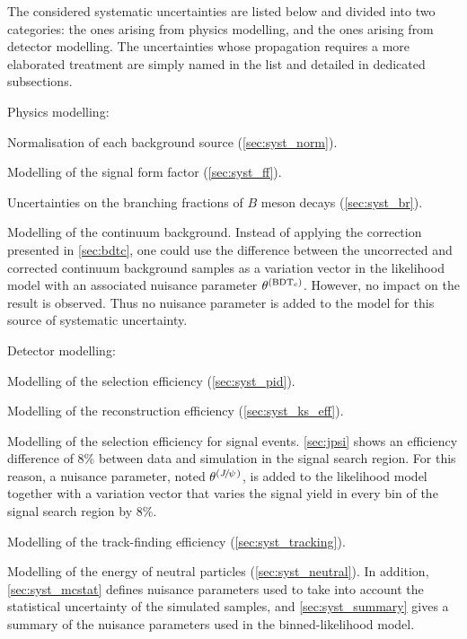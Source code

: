 The considered systematic uncertainties are listed below and divided into two categories: the ones arising from physics modelling, and the ones arising from detector modelling.
The uncertainties whose propagation requires a more elaborated treatment are simply named in the list and detailed in dedicated subsections.
\bi
\item Physics modelling:
\bi
\item Normalisation of each background source (\cref{sec:syst_norm}).
\item Modelling of the signal form factor (\cref{sec:syst_ff}).
\item Uncertainties on the branching fractions of $B$ meson decays (\cref{sec:syst_br}).
\item Modelling of the continuum background.
Instead of applying the correction presented in \cref{sec:bdtc}, one could use the difference between the uncorrected and corrected continuum background samples as a variation vector in the likelihood model with an associated nuisance parameter $\theta^{(\mathrm{\mathrm{BDT_c}})}$.
However, no impact on the result is observed.
Thus no nuisance parameter is added to the model for this source of systematic uncertainty.
\ei
\item Detector modelling:
\bi
\item Modelling of the \PID selection efficiency (\cref{sec:syst_pid}).
\item Modelling of the \KS reconstruction efficiency (\cref{sec:syst_ks_eff}).
\item Modelling of the \bdtt selection efficiency for signal events.
\cref{sec:jpsi} shows an efficiency difference of 8\% between data and simulation in the signal search region.
For this reason, a nuisance parameter, noted $\theta^{({J\mskip -3mu/\mskip -2mu\psi\mskip 2mu})}$, is added to the likelihood model together with a variation vector that varies the signal yield in every bin of the signal search region by 8\%.
\item Modelling of the track-finding efficiency (\cref{sec:syst_tracking}).
\item Modelling of the energy of neutral particles (\cref{sec:syst_neutral}).
\ei
\ei
In addition, \cref{sec:syst_mcstat} defines nuisance parameters used to take into account the statistical uncertainty of the simulated samples, and \cref{sec:syst_summary} gives a summary of the nuisance parameters used in the binned-likelihood model.
